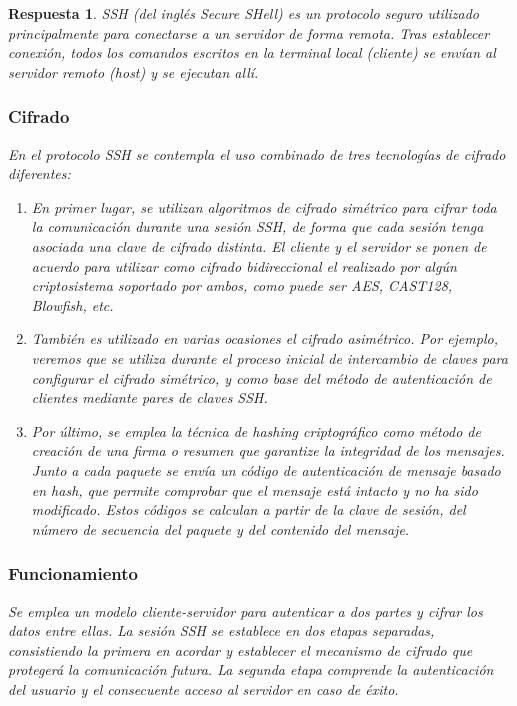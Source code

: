 \documentclass[
  a4paper,
  spanish,
  12pt,
]{scrartcl}
\theoremstyle{ejercicio-style}
\theoremstyle{remark-style}
\newtheorem*{sol}{Respuesta}
\theoremstyle{teorema-style}
\begin{document}
\begin{sol}
  SSH (del inglés \textit{Secure SHell}) es un protocolo seguro utilizado principalmente para conectarse a un servidor de forma remota. Tras establecer conexión, todos los comandos escritos en la terminal local (\textit{cliente}) se envían al servidor remoto (\textit{host}) y se ejecutan allí.

  \subsubsection*{Cifrado}
  En el protocolo SSH se contempla el uso combinado de tres tecnologías de cifrado diferentes:
  \begin{enumerate}
  \item En primer lugar, se utilizan algoritmos de \textit{cifrado simétrico} para cifrar toda la comunicación durante una sesión SSH, de forma que cada sesión tenga asociada una clave de cifrado distinta. El cliente y el servidor se ponen de acuerdo para utilizar como cifrado bidireccional el realizado por algún criptosistema soportado por ambos, como puede ser AES, CAST128, Blowfish, etc.
  \item También es utilizado en varias ocasiones el \textit{cifrado asimétrico}. Por ejemplo, veremos que se utiliza durante el proceso inicial de intercambio de claves para configurar el cifrado simétrico, y como base del método de autenticación de clientes mediante pares de claves SSH.
  \item Por último, se emplea la técnica de \textit{hashing} criptográfico como método de creación de una firma o resumen que garantize la integridad de los mensajes. Junto a cada paquete se envía un \textit{código de autenticación de mensaje basado en hash}, que permite comprobar que el mensaje está intacto y no ha sido modificado. Estos códigos se calculan a partir de la clave de sesión, del número de secuencia del paquete y del contenido del mensaje.
  \end{enumerate}

  \subsubsection*{Funcionamiento}

  Se emplea un modelo cliente-servidor para autenticar a dos partes y cifrar los datos entre ellas. La sesión SSH se establece en dos etapas separadas, consistiendo la primera en acordar y establecer el mecanismo de cifrado que protegerá la comunicación futura. La segunda etapa comprende la autenticación del usuario y el consecuente acceso al servidor en caso de éxito.


\end{sol}
\end{document}

